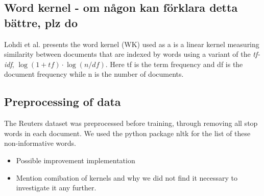 \subsection{Word kernel - om någon kan förklara detta bättre, plz do}
Lohdi et al. presents the word kernel (WK) used as a is a linear kernel measuring similarity between documents that are indexed by words using a variant of the \textit{tf-idf}, $ \log(1+tf) \cdot \log(n/df) $. Here tf is the term frequency and df is the document frequency while n is the number of documents. 


\subsection{Preprocessing of data}
The Reuters dataset was preprocessed before training, through removing all stop words in each document. We used the python package nltk for the list of these non-informative words.


\begin{itemize}
	
	
	\item Possible improvement implementation 
	
	\item Mention comibation of kernels and why we did not find it necessary to investigate it any further. 
	
\end{itemize}

